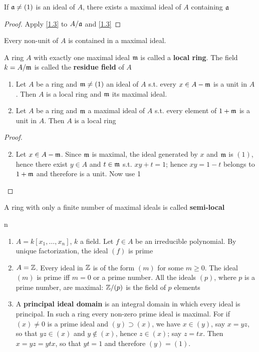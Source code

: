 \documentclass[11pt]{article}
\begin{document}
\begin{corollary}[]
If \(\mathfrak{a}\neq(1)\) is an ideal of \(A\), there exists a maximal ideal of \(A\) containing \(\mathfrak{a}\)
\end{corollary}

\begin{proof}
Apply \ref{1.3} to \(A/\mathfrak{a}\) and \ref{1.3}
\end{proof}

\begin{corollary}[]
\label{1.5}
Every non-unit of \(A\) is contained in a maximal ideal.
\end{corollary}

A ring \(A\) with exactly one maximal ideal \(\mathfrak{m}\) is called a \textbf{local ring}. The field \(k=A/\mathfrak{m}\) is
called the \textbf{residue field} of \(A\)

\begin{proposition}[]
\begin{enumerate}
\item Let \(A\) be a ring and \(\mathfrak{m}\neq(1)\) an ideal of \(A\) s.t. every \(x\in A-\mathfrak{m}\) is a unit in \(A\).
Then \(A\) is a local ring and \(\mathfrak{m}\) its maximal ideal.
\item Let \(A\) be a ring and \(\mathfrak{m}\) a maximal ideal of \(A\) s.t. every element of \(1+\mathfrak{m}\) is a
unit in \(A\). Then \(A\) is a local ring
\end{enumerate}
\end{proposition}

\begin{proof}
\begin{enumerate}
\setcounter{enumi}{1}
\item Let \(x\in A-\mathfrak{m}\). Since \(\mathfrak{m}\) is maximal, the ideal generated by \(x\) and \(\mathfrak{m}\)
is \((1)\), hence there exist \(y\in A\) and \(t\in\mathfrak{m}\) s.t. \(xy+t=1\); hence \(xy=1-t\) belongs
to \(1+\mathfrak{m}\) and therefore is a unit. Now use 1
\end{enumerate}
\end{proof}

A ring with only a finite number of maximal ideals is called \textbf{semi-local}

\begin{examplle}[]n
\begin{enumerate}
\item \(A=k[x_1,\dots,x_n]\), \(k\) a field. Let \(f\in A\) be an irreducible polynomial. By unique
factorization, the ideal \((f)\) is prime
\item \(A=\mathbb{Z}\). Every ideal in \(\mathbb{Z}\) is of the form \((m)\) for some \(m\ge 0\). The ideal \((m)\) is
prime iff \(m=0\) or a prime number. All the ideals \((p)\), where \(p\) is a prime number,
are maximal: \(\mathbb{Z}/(p)\) is the field of \(p\) elements
\item A \textbf{principal ideal domain} is an integral domain in which every ideal is principal. In such a
ring every non-zero prime ideal is maximal. For if \((x)\neq 0\) is a prime ideal
and \((y)\supset(x)\), we have \(x\in(y)\), say \(x=yz\), so that \(yz\in(x)\) and \(y\notin(x)\),
hence \(z\in(x)\); say \(z=tx\). Then \(x=yz=ytx\), so that \(yt=1\) and therefore \((y)=(1)\).
\end{enumerate}
\end{examplle}
\end{document}
